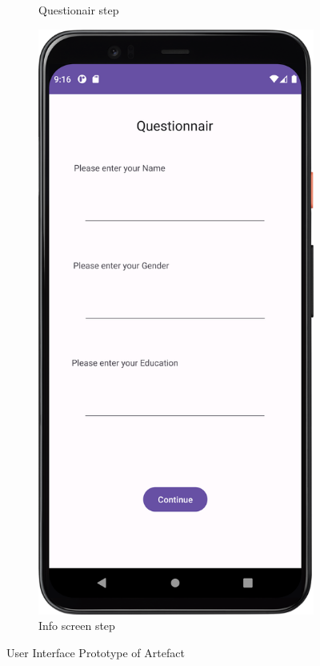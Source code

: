 \begin{figure}[htbp]
\begin{subfigure}[b]{0.25\textwidth}
        \caption{Questionair step}
        \label{subfig:Questionair2}
    \end{subfigure}
    \hspace{1cm}
    \begin{subfigure}[b]{0.25\textwidth}
        \centering
        \includegraphics[width=\textwidth]{content/06_demonstration_of_the_artifact/Screenshot_QuestionnairScreen.png}
        \caption{Info screen step}
        \label{subfig:InfoScreen2}
    \end{subfigure}
       \caption{User Interface Prototype of Artefact}
       \label{fig:uiScreens}
\end{figure}

